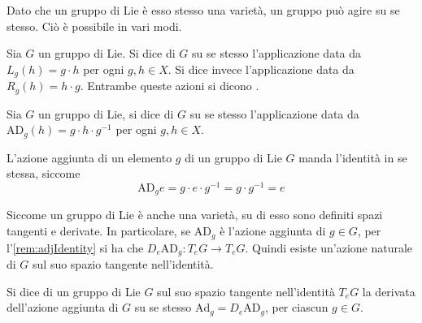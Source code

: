 Dato che un gruppo di Lie è esso stesso una varietà, un gruppo può agire su se stesso. Ciò è possibile in vari modi.

\begin{definition}
  Sia $G$ un gruppo di Lie. Si dice  di $G$ su se stesso l'applicazione data da $L_g(h) = g \cdot h$ per ogni $g,h \in X$. Si dice invece  l'applicazione data da $R_g(h) = h \cdot g$. Entrambe queste azioni si dicono .
\end{definition}
\begin{definition}
  Sia $G$ un gruppo di Lie, si dice  di $G$ su se stesso l'applicazione data da $\mathrm{AD}_g(h) = g \cdot h \cdot g^{-1}$ per ogni $g,h \in X$.
\end{definition}
\begin{remark} \label{rem:adjIdentity}
  L'azione aggiunta di un elemento $g$ di un gruppo di Lie $G$ manda l'identità in se stessa, siccome \begin{equation*}
    \mathrm{AD}_g e = g\cdot e\cdot g^{-1} = g\cdot g^{-1} = e
  \end{equation*} 
\end{remark}

Siccome un gruppo di Lie è anche una varietà, su di esso sono definiti spazi tangenti e derivate. In particolare, se $\mathrm{AD}_g$ è l'azione aggiunta di $g \in G$, per l'\autoref{rem:adjIdentity} si ha che $D_e \mathrm{AD}_g: T_e G \to T_e G$. Quindi esiste un'azione naturale di $G$ sul suo spazio tangente nell'identità.
\begin{definition}
  Si dice  di un gruppo di Lie $G$ sul suo spazio tangente nell'identità $T_e G$ la derivata dell'azione aggiunta di $G$ su se stesso $\mathrm{Ad}_g = D_e \mathrm{AD}_g$, per ciascun $g \in G$. 
\end{definition}

